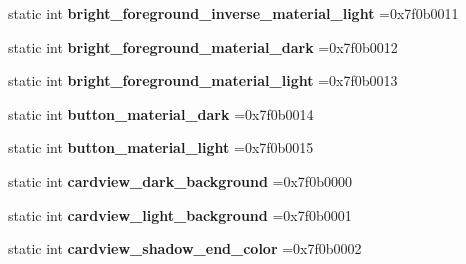 \begin{DoxyCompactItemize}
\mbox{\label{classandroid_1_1support_1_1v4_1_1R_1_1color_a63ae03fa657a5cff70035c88acb2b0c7}} 
static int {\bfseries bright\+\_\+foreground\+\_\+inverse\+\_\+material\+\_\+light} =0x7f0b0011
\item 
\mbox{\label{classandroid_1_1support_1_1v4_1_1R_1_1color_a2028f20a46ab1b133772260aa0d5a465}} 
static int {\bfseries bright\+\_\+foreground\+\_\+material\+\_\+dark} =0x7f0b0012
\item 
\mbox{\label{classandroid_1_1support_1_1v4_1_1R_1_1color_ae0e19dabf3e0e58a59fb68cb8eeb7e03}} 
static int {\bfseries bright\+\_\+foreground\+\_\+material\+\_\+light} =0x7f0b0013
\item 
\mbox{\label{classandroid_1_1support_1_1v4_1_1R_1_1color_a4f7e4b71499d6e63b1bf558c7ba0076d}} 
static int {\bfseries button\+\_\+material\+\_\+dark} =0x7f0b0014
\item 
\mbox{\label{classandroid_1_1support_1_1v4_1_1R_1_1color_ae72e1dacac0304e2e5971965fbd41598}} 
static int {\bfseries button\+\_\+material\+\_\+light} =0x7f0b0015
\item 
\mbox{\label{classandroid_1_1support_1_1v4_1_1R_1_1color_a74d0b4bef7810f081d0ccd5cae9ec9f3}} 
static int {\bfseries cardview\+\_\+dark\+\_\+background} =0x7f0b0000
\item 
\mbox{\label{classandroid_1_1support_1_1v4_1_1R_1_1color_a6e9de13fbd68739a6afb1609b79c3deb}} 
static int {\bfseries cardview\+\_\+light\+\_\+background} =0x7f0b0001
\item 
\mbox{\label{classandroid_1_1support_1_1v4_1_1R_1_1color_ae7c657faf47028b140f79007f0efd29a}} 
static int {\bfseries cardview\+\_\+shadow\+\_\+end\+\_\+color} =0x7f0b0002
\item 
\mbox{\label{classandroid_1_1support_1_1v4_1_1R_1_1color_a2deb69020e381556e43a055db44f0967}} 

\end{DoxyCompactItemize}
